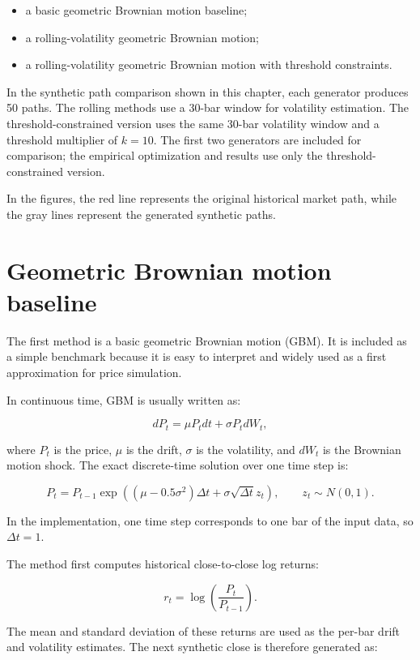 \begin{itemize}
    \item a basic geometric Brownian motion baseline;
    \item a rolling-volatility geometric Brownian motion;
    \item a rolling-volatility geometric Brownian motion with threshold constraints.
\end{itemize}

In the synthetic path comparison shown in this chapter, each generator produces 50 paths. The
rolling methods use a 30-bar window for volatility estimation. The threshold-constrained version
uses the same 30-bar volatility window and a threshold multiplier of \(k = 10\).
The first two generators are included for comparison; the empirical optimization and results use
only the threshold-constrained version.

In the figures, the red line represents the original historical market path, while the gray lines
represent the generated synthetic paths.

\section{Geometric Brownian motion baseline}

The first method is a basic geometric Brownian motion (GBM). It is included as a simple benchmark
because it is easy to interpret and widely used as a first approximation for price simulation.

In continuous time, GBM is usually written as:

\[
dP_t = \mu P_t dt + \sigma P_t dW_t,
\]

where \(P_t\) is the price, \(\mu\) is the drift, \(\sigma\) is the volatility, and \(dW_t\) is the
Brownian motion shock. The exact discrete-time solution over one time step is:

\[
P_t = P_{t-1}
\exp\left((\mu - 0.5\sigma^2)\Delta t + \sigma \sqrt{\Delta t} z_t\right),
\qquad z_t \sim N(0,1).
\]

In the implementation, one time step corresponds to one bar of the input data, so \(\Delta t = 1\).

The method first computes historical close-to-close log returns:

\[
r_t = \log\left(\frac{P_t}{P_{t-1}}\right).
\]

The mean and standard deviation of these returns are used as the per-bar drift and volatility
estimates. The next synthetic close is therefore generated as:

